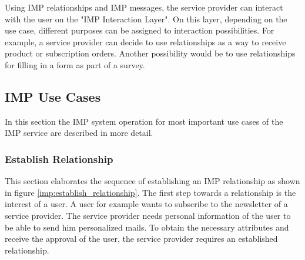 Using IMP relationships and IMP messages, the service provider can interact with the user on the "IMP Interaction Layer". On this layer, depending on the use case, different purposes can be assigned to interaction possibilities. For example, a service provider can decide to use relationships as a way to receive product or subscription orders. Another possibility would be to use relationships for filling in a form as part of a survey.

\subsection{IMP Use Cases}

In this section the IMP system operation for most important use cases of the IMP service are described in more detail.

\subsubsection{Establish Relationship}

This section elaborates the sequence of establishing an IMP relationship as shown in figure \ref{imp:establish_relationship}.
The first step towards a relationship is the interest of a user. A user for example wants to subscribe to the newsletter of a service provider. The service provider needs personal information of the user to be able to send him personalized mails. To obtain the necessary attributes and receive the approval of the user, the service provider requires an established relationship.

